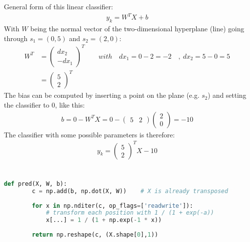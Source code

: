\documentclass[11pt]{article}
\newcommand{\exercise}{\section{}}
\begin{document}
\exercise
\begin{center}
\end{center}
General form of this linear classifier:
\begin{align*}
	y_k = W^T X + b
\end{align*}
With $W$ being the normal vector of the two-dimensional hyperplane (line) going through $s_1=(0,5)$ and $s_2=(2,0)$:
\begin{align*}
	W^T &= 
	\begin{pmatrix}
	dx_2\\-dx_1
	\end{pmatrix}^T
	\quad\quad with\quad dx_1 = 0 - 2 = -2\quad,\ dx_2= 5-0 = 5\\
	&= 
	\begin{pmatrix}
	5\\2
	\end{pmatrix}^T
\end{align*}
The bias can be computed by inserting a point on the plane (e.g. $s_2$) and setting the classifier to $0$, like this:
\begin{align*}
	b = 0 - W^T X = 0 - 
	\begin{pmatrix}
	5 & 2
	\end{pmatrix}
	\begin{pmatrix}
	2\\0
	\end{pmatrix}
	= -10
\end{align*}
The classifier with some possible parameters is therefore:
\begin{align*}
	y_k = 
	\begin{pmatrix}
	5\\2
	\end{pmatrix}^T 
	X - 10
\end{align*}

\exercise
\begin{lstlisting}[language=Python]
	def pred(X, W, b):    
		c = np.add(b, np.dot(X, W))    # X is already transposed
		
		for x in np.nditer(c, op_flags=['readwrite']):
			# transform each position with 1 / (1 + exp(-a))
			x[...] = 1 / (1 + np.exp(-1 * x))
		
		return np.reshape(c, (X.shape[0],1))
\end{lstlisting}
\end{document}
